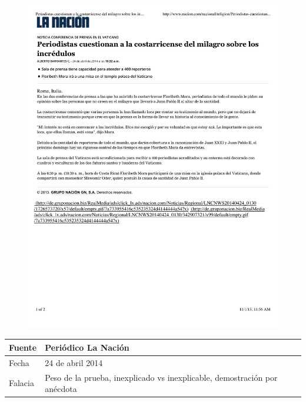 \documentclass[times]{simauth}
\begin{document}
\begin{figure}[h]
    \centering
    \includegraphics[width=15cm]{floribeth-mora-milagro}
    \label{fig:falacia2}
\end{figure}

\newpage

\begin{table}[h!]
    \begin{tabular}{ll} 
        \toprule[1.5pt]
        Fuente & Periódico La Nación\\
        \midrule[0.5pt]
        Fecha  & 24 de abril 2014\\
        \midrule[0.5pt]
        Falacia & Peso de la prueba, inexplicado vs inexplicable, demostración por anécdota \\
        \bottomrule[1.5pt]
    \end{tabular} 
\end{table}
\end{document}
